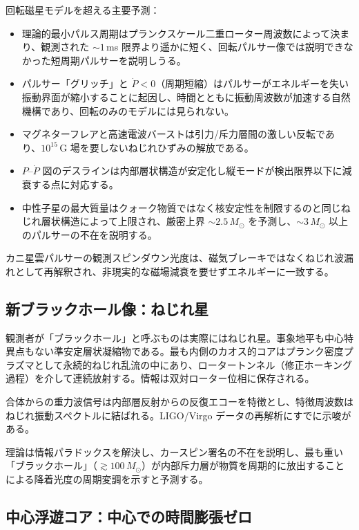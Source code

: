 \documentclass[dvipdfmx,a4paper]{article}
\begin{document}
回転磁星モデルを超える主要予測：
\begin{itemize}
\item 理論的最小パルス周期はプランクスケール二重ローター周波数によって決まり、観測された $\sim 1$\,ms 限界より遥かに短く、回転パルサー像では説明できなかった短周期パルサーを説明しうる。
\item パルサー「グリッチ」と $\dot{P} < 0$（周期短縮）はパルサーがエネルギーを失い振動界面が縮小することに起因し、時間とともに振動周波数が加速する自然機構であり、回転のみのモデルには見られない。
\item マグネターフレアと高速電波バーストは引力/斥力層間の激しい反転であり、$10^{15}$\,G 場を要しないねじれひずみの解放である。
\item $P$--$\dot{P}$ 図のデスラインは内部層状構造が安定化し縦モードが検出限界以下に減衰する点に対応する。
\item 中性子星の最大質量はクォーク物質ではなく核安定性を制限するのと同じねじれ層状構造によって上限され、厳密上界 $\sim 2.5\,M_\odot$ を予測し、$\sim 3\,M_\odot$ 以上のパルサーの不在を説明する。
\end{itemize}

カニ星雲パルサーの観測スピンダウン光度は、磁気ブレーキではなくねじれ波漏れとして再解釈され、非現実的な磁場減衰を要せずエネルギーに一致する。

\subsection{新ブラックホール像：ねじれ星}

観測者が「ブラックホール」と呼ぶものは実際にはねじれ星。事象地平も中心特異点もない準安定層状凝縮物である。最も内側のカオス的コアはプランク密度プラズマとして永続的ねじれ乱流の中にあり、ロータートンネル（修正ホーキング過程）を介して連続放射する。情報は双対ローター位相に保存される。

合体からの重力波信号は内部層反射からの反復エコーを特徴とし、特徴周波数はねじれ振動スペクトルに結ばれる。LIGO/Virgo データの再解析にすでに示唆がある。

理論は情報パラドックスを解決し、カースピン署名の不在を説明し、最も重い「ブラックホール」（$\gtrsim 100\,M_\odot$）が内部斥力層が物質を周期的に放出することによる降着光度の周期変調を示すと予測する。

\subsection{中心浮遊コア：中心での時間膨張ゼロ}
\end{document}
